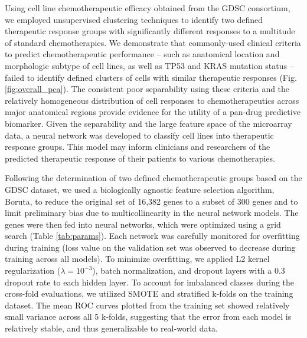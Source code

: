 \documentclass[10pt, letterpaper, twocolumn]{article}
\begin{document}
Using cell line chemotherapeutic efficacy obtained from the GDSC consortium, we employed unsupervised clustering techniques to identify two defined therapeutic response groups with significantly different responses to a multitude of standard chemotherapies. We demonstrate that commonly-used clinical criteria to predict chemotherapeutic performance -- such as anatomical location and morphologic subtype of cell lines, as well as TP53 and KRAS mutation status -- failed to identify defined clusters of cells with similar therapeutic responses (Fig. \ref{fig:overall_pca}). The consistent poor separability using these criteria and the relatively homogeneous distribution of cell responses to chemotherapeutics across major anatomical regions provide evidence for the utility of a pan-drug predictive biomarker. Given the separability and the large feature space of the microarray data, a neural network was developed to classify cell lines into therapeutic response groups. This model may inform clinicians and researchers of the predicted therapeutic response of their patients to various chemotherapies.

Following the determination of two defined chemotherapeutic groups based on the GDSC dataset, we used a biologically agnostic feature selection algorithm, Boruta, to reduce the original set of 16,382 genes to a subset of 300 genes and to limit preliminary bias due to multicollinearity in the neural network models. The genes were then fed into neural networks, which were optimized using a grid search (Table \ref{tab:params}). Each network was carefully monitored for overfitting during training (loss value on the validation set was observed to decrease during training across all models). To minimize overfitting, we applied L2 kernel regularization ($\lambda=10^{-3}$), batch normalization, and dropout layers with a 0.3 dropout rate to each hidden layer. To account for imbalanced classes during the cross-fold evaluations, we utilized SMOTE and stratified k-folds on the training dataset. The mean ROC curves plotted from the training set showed relatively small variance across all 5 k-folds, suggesting that the error from each model is relatively stable, and thus generalizable to real-world data.
\end{document}
